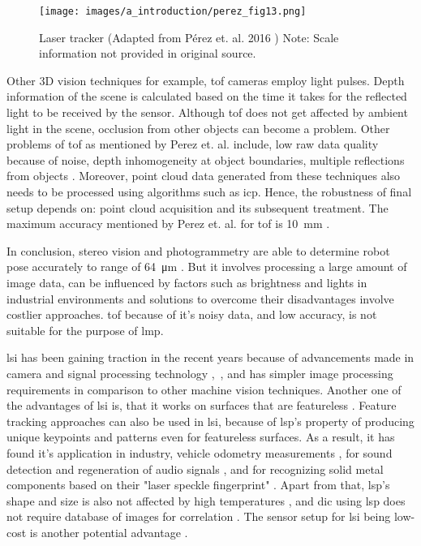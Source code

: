     \vspace{5mm}
    \begin{figure}[h]
        \centering
        \texttt{[image: images/a\_introduction/perez\_fig13.png]}
        \caption{Laser tracker (Adapted from Pérez et. al. 2016 \cite{perez}) Note: Scale information not provided in original source.}
        \label{fig:perez_fig13}
    \end{figure}
    \vspace{5mm}
    
    \noindent Other 3D vision techniques for example, \gls{tof} cameras employ light pulses. Depth information of the scene is calculated based on the time it takes for the reflected light to be received by the sensor. Although \gls{tof} does not get affected by ambient light in the scene, occlusion from other objects can become a problem. Other problems of \gls{tof} as mentioned by Perez et. al. include, low raw data quality because of noise, depth inhomogeneity at object boundaries, multiple reflections from objects \cite{perez}. Moreover, point cloud data generated from these techniques also needs to be processed using algorithms such as \gls{icp}. Hence, the robustness of final setup depends on: point cloud acquisition and its subsequent treatment. The maximum accuracy mentioned by Perez et. al. for \gls{tof} is \SI{10}{\milli\meter} \cite{perez}.
    
    \vspace{5mm}
    \noindent In conclusion, stereo vision and photogrammetry are able to determine robot pose accurately to range of \SI{64}{\micro\meter} \cite{perez}. But it involves processing a large amount of image data, can be influenced by factors such as brightness and lights in industrial environments and solutions to overcome their disadvantages involve costlier approaches. \gls{tof} because of it's noisy data, and low accuracy, is not suitable for the purpose of \gls{lmp}.

    \vspace{5mm}

    \noindent \gls{lsi} has been gaining traction in the recent years because of advancements made in camera and signal processing technology \cite{filter},\ \cite{farsad}, and has simpler image processing requirements in comparison to other machine vision techniques. Another one of the advantages of \gls{lsi} is, that it works on surfaces that are featureless \cite{francis_autonomous}. Feature tracking approaches can also be used in \gls{lsi}, because of \gls{lsp}'s property of producing unique keypoints and patterns even for featureless surfaces. As a result, it has found it's application in industry, vehicle odometry measurements \cite{charrett_mars}, for sound detection and regeneration of audio signals \cite{nan_wu}, and for recognizing solid metal components based on their "laser speckle fingerprint" \cite{sjoedahl}. Apart from that, \gls{lsp}'s shape and size is also not affected by high temperatures \cite{song}, and \gls{dic} using \gls{lsp} does not require database of images for correlation \cite{farsad}. The sensor setup for \gls{lsi} being low-cost is another potential advantage \cite{charrett_2018}.


